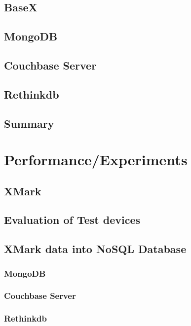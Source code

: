 \documentclass[a4paper,12pt]{article}
\begin{document}
		\subsection{BaseX}
		\subsection{MongoDB}
		\label{couchbase-general}
		\subsection{Couchbase Server}
		\subsection{Rethinkdb}		
		\subsection{Summary}
	\newpage
	\section{Performance/Experiments}
		\subsection{XMark}
		\label{xmark}
			
		\subsection{Evaluation of Test devices}
		\subsection{XMark data into NoSQL Database}
			\label{xmark-nosql}
			
			\newpage			
			\subsubsection{MongoDB}
			\label{xmark-mongodb}
			
			\subsubsection{Couchbase Server}
			\label{xmark-couchbase}
			
			\subsubsection{Rethinkdb}
			\label{xmark-rethinkdb}
					
\end{document}
